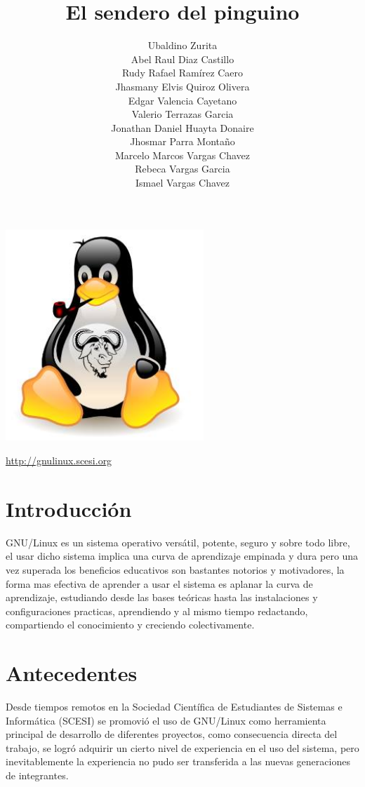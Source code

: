 \documentclass[letterpaper,11pt]{article}
\title{\bf El sendero del pinguino}
\author{
\begin{tabular}{l}
    Ubaldino Zurita \\
    Abel Raul Diaz Castillo\\ 
    Rudy Rafael Ramírez Caero\\
    Jhasmany Elvis Quiroz Olivera\\
    Edgar Valencia Cayetano\\
    Valerio Terrazas Garcia\\
    Jonathan Daniel Huayta Donaire\\
    Jhosmar Parra Montaño\\
    Marcelo Marcos Vargas Chavez\\
    Rebeca Vargas Garcia\\
    Ismael Vargas Chavez
\end{tabular}
}
\begin{document}
\maketitle
\begin{center}\includegraphics[width=0.56\textwidth]
{img/penguin.jpg}\end{center}
\begin{center}\url {http://gnulinux.scesi.org}\end{center}
\pagebreak

\tableofcontents
\pagebreak

\section{Introducción}
GNU/Linux es un sistema operativo versátil, potente, seguro y sobre todo libre, el usar dicho sistema implica una curva de aprendizaje empinada y dura pero una vez superada los beneficios educativos son bastantes notorios y motivadores, la forma mas efectiva de aprender a usar el sistema es aplanar la curva de aprendizaje, estudiando desde las bases teóricas hasta las instalaciones y configuraciones practicas, aprendiendo y al mismo 	tiempo redactando, compartiendo el conocimiento y creciendo colectivamente. 

\section{Antecedentes}
Desde tiempos remotos en la Sociedad Científica de Estudiantes de Sistemas e Informática (SCESI) se promovió el uso de GNU/Linux como herramienta principal de desarrollo de diferentes proyectos, como consecuencia directa del trabajo, se logró adquirir un cierto nivel de experiencia en el uso del sistema, pero inevitablemente la experiencia no pudo ser transferida a las nuevas generaciones de integrantes.
	
\end{document}
